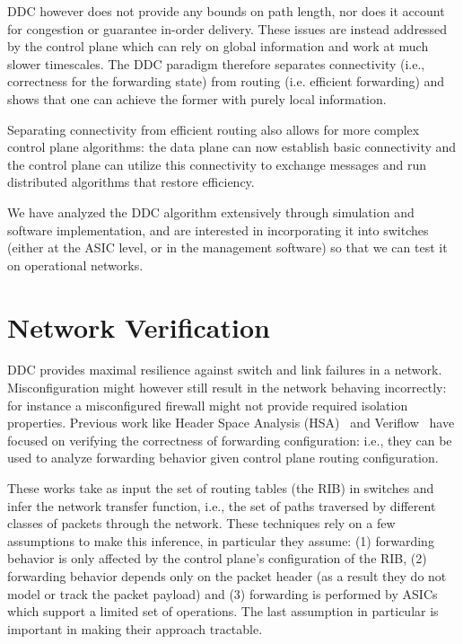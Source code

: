 \documentclass[letterpaper]{article}
\begin{document}
DDC however does not provide any bounds on path length, nor does it account for congestion or guarantee in-order
delivery. These issues are instead addressed by the control plane which can rely on global information and work at much
slower timescales. The DDC paradigm therefore separates connectivity (i.e., correctness for the forwarding state) from
routing (i.e. efficient forwarding) and shows that one can achieve the former with purely local information. 

Separating connectivity from efficient routing also allows for more complex control plane algorithms: the data
plane can now establish basic connectivity and the control plane can utilize this connectivity to exchange messages and
run distributed algorithms that restore efficiency.

We have analyzed the DDC algorithm extensively through simulation and software implementation, and are interested in incorporating it into switches (either at the ASIC level, or in the management software) so that we can test it on operational networks.

\section*{Network Verification}
DDC provides maximal resilience against switch and link failures in a network. Misconfiguration might however still result in
the network behaving incorrectly: for instance a misconfigured firewall might not provide required isolation properties.
Previous work like Header Space Analysis (HSA)~\cite{kazemian2012header} and Veriflow~\cite{khurshid13veriflow} have
focused on verifying the correctness of forwarding configuration: i.e., they can be used to analyze forwarding behavior
given control plane routing configuration.

These works take as input the set of routing tables (the RIB) in switches and infer the network transfer function, i.e.,
the set of paths traversed by different classes of packets through the network. These techniques rely on a few
assumptions to make this inference, in particular they assume: (1) forwarding behavior is only affected by the control
plane's configuration of the RIB, (2) forwarding behavior depends only on the packet header (as a result they do not model or track the packet
payload) and (3) forwarding is performed by ASICs which support a limited set of operations. The last assumption in
particular is important in making their approach tractable.
\end{document}
